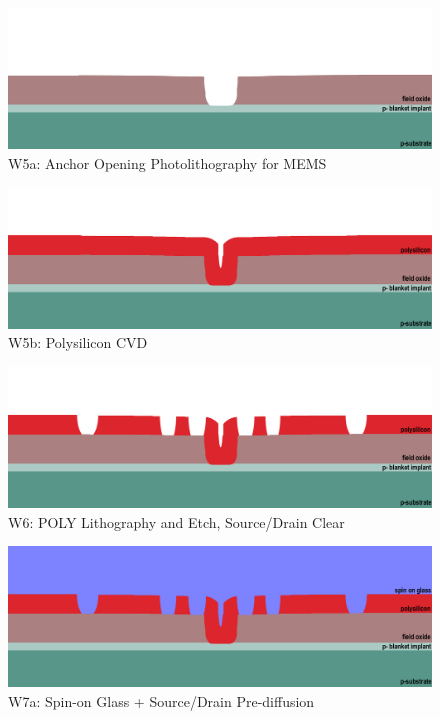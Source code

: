 \documentclass{article}
\begin{document}
\begin{figure}[H]
\centering
\includegraphics[width=350pt]{CrossSections/MEMSlabprofiles/MEMSw5a.png}
\caption{W5a: Anchor Opening Photolithography for MEMS}
\end{figure}
\begin{figure}[H]
\centering
\includegraphics[width=350pt]{CrossSections/MEMSlabprofiles/MEMSw5b.png}
\caption{W5b: Polysilicon CVD}
\end{figure}
\begin{figure}[H]
\centering
\includegraphics[width=350pt]{CrossSections/MEMSlabprofiles/MEMSw6.png}
\caption{W6: POLY Lithography and Etch, Source/Drain Clear}
\end{figure}
\begin{figure}[H]
\centering
\includegraphics[width=350pt]{CrossSections/MEMSlabprofiles/MEMSw7a.png}
\caption{W7a: Spin-on Glass + Source/Drain Pre-diffusion}
\end{figure}
\end{document}

